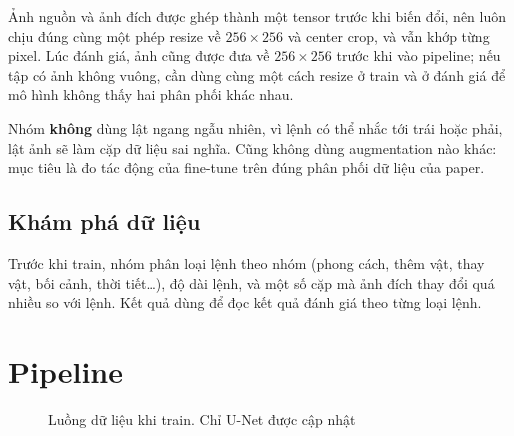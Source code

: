 \documentclass[12pt,a4paper]{article}
\begin{document}
Ảnh nguồn và ảnh đích được ghép thành một tensor trước khi biến đổi, nên luôn chịu
đúng cùng một phép resize về $256\times256$ và center crop, và vẫn khớp từng pixel.
Lúc đánh giá, ảnh cũng được đưa về $256\times256$ trước khi vào pipeline; nếu tập có
ảnh không vuông, cần dùng cùng một cách resize ở train và ở đánh giá để mô hình không
thấy hai phân phối khác nhau.

Nhóm \textbf{không} dùng lật ngang ngẫu nhiên, vì lệnh có thể nhắc tới trái hoặc
phải, lật ảnh sẽ làm cặp dữ liệu sai nghĩa. Cũng không dùng augmentation nào khác:
mục tiêu là đo tác động của fine-tune trên đúng phân phối dữ liệu của paper.

\subsection{Khám phá dữ liệu}

Trước khi train, nhóm phân loại lệnh theo nhóm (phong cách, thêm vật, thay vật, bối
cảnh, thời tiết\ldots), độ dài lệnh, và một số cặp mà ảnh đích thay đổi quá nhiều so
với lệnh. Kết quả dùng để đọc kết quả đánh giá theo từng loại lệnh.

\section{Pipeline}

\begin{figure}[H]
\centering
{}
\caption{Luồng dữ liệu khi train. Chỉ U-Net được cập nhật}
\end{figure}
\end{document}
